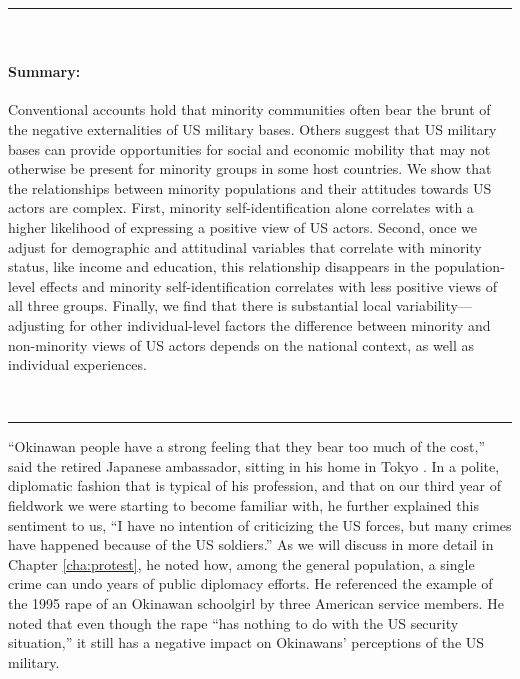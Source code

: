 

\vspace*{-0.85cm}
\rule{\linewidth}{0.10pt} \\[-1.25cm]
{\footnotesize\paragraph{Summary:} Conventional accounts hold that minority communities often bear the brunt of the negative externalities of US military bases. Others suggest that US military bases can provide opportunities for social and economic mobility that may not otherwise be present for minority groups in some host countries. We show that the relationships between minority populations and their attitudes towards US actors are complex. First, minority self-identification alone correlates with a higher likelihood of expressing a positive view of US actors. Second, once we adjust for demographic and attitudinal variables that correlate with minority status, like income and education, this relationship disappears in the population-level effects and minority self-identification correlates with less positive views of all three groups. Finally, we find that there is substantial local variability---adjusting for other individual-level factors the difference between minority and non-minority views of US actors depends on the national context, as well as individual experiences.} 
\\[-0.5cm] 
\rule{\linewidth}{0.10pt}

\vspace*{0.5cm}



``Okinawan people have a strong feeling that they bear too much of the cost,'' said the retired Japanese ambassador, sitting in his home in Tokyo \cite{tokyoone20200427}. In a polite, diplomatic fashion that is typical of his profession, and that on our third year of fieldwork we were starting to become familiar with, he further explained this sentiment to us, ``I have no intention of criticizing the US forces, but many crimes have happened because of the US soldiers.'' As we will discuss in more detail in Chapter \ref{cha:protest}, he noted how, among the general population, a single crime can undo years of public diplomacy efforts. He referenced the example of the 1995 rape of an Okinawan schoolgirl by three American service members. He noted that even though the rape ``has nothing to do with the US security situation,''  it still has a negative impact on Okinawans' perceptions of the US military. 

